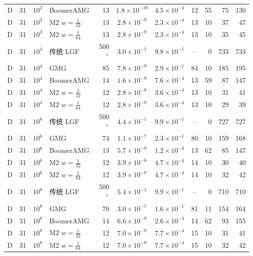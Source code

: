 \begin{longtable}{lrrlrcccrrr}
D & 31 & $10^{2}$ & BoomerAMG & 13 & $1.8{\times}10^{-10}$ & $4.5{\times}10^{-4}$ & 12 & 55 & 75 & 130 \\
D & 31 & $10^{2}$ & M2 $w{=}\frac1{32}$ & 13 & $2.8{\times}10^{-9}$ & $2.3{\times}10^{-4}$ & 13 & 10 & 37 & 47 \\
D & 31 & $10^{2}$ & M2 $w{=}\frac1{64}$ & 13 & $2.8{\times}10^{-9}$ & $2.3{\times}10^{-4}$ & 13 & 10 & 35 & 45 \\
D & 31 & $10^{4}$ & 传统 LGF & 500$^\times$ & $3.0{\times}10^{-1}$ & $9.8{\times}10^{-1}$ & -- & 0 & 733 & 733 \\
D & 31 & $10^{4}$ & GMG & 85 & $7.8{\times}10^{-9}$ & $2.9{\times}10^{-1}$ & 84 & 10 & 185 & 195 \\
D & 31 & $10^{4}$ & BoomerAMG & 14 & $1.6{\times}10^{-9}$ & $7.6{\times}10^{-4}$ & 13 & 59 & 87 & 147 \\
D & 31 & $10^{4}$ & M2 $w{=}\frac1{32}$ & 12 & $2.8{\times}10^{-8}$ & $3.6{\times}10^{-4}$ & 13 & 10 & 31 & 41 \\
D & 31 & $10^{4}$ & M2 $w{=}\frac1{64}$ & 12 & $2.8{\times}10^{-8}$ & $3.6{\times}10^{-4}$ & 13 & 10 & 29 & 39 \\
D & 31 & $10^{6}$ & 传统 LGF & 500$^\times$ & $4.4{\times}10^{-1}$ & $9.9{\times}10^{-1}$ & -- & 0 & 727 & 727 \\
D & 31 & $10^{6}$ & GMG & 74 & $1.1{\times}10^{-7}$ & $2.3{\times}10^{-1}$ & 80 & 10 & 159 & 168 \\
D & 31 & $10^{6}$ & BoomerAMG & 13 & $5.7{\times}10^{-9}$ & $1.2{\times}10^{-3}$ & 13 & 62 & 85 & 147 \\
D & 31 & $10^{6}$ & M2 $w{=}\frac1{32}$ & 12 & $3.9{\times}10^{-8}$ & $4.7{\times}10^{-4}$ & 14 & 10 & 30 & 40 \\
D & 31 & $10^{6}$ & M2 $w{=}\frac1{64}$ & 12 & $3.9{\times}10^{-8}$ & $4.7{\times}10^{-4}$ & 14 & 10 & 32 & 42 \\
D & 31 & $10^{8}$ & 传统 LGF & 500$^\times$ & $5.4{\times}10^{-1}$ & $9.9{\times}10^{-1}$ & -- & 0 & 710 & 710 \\
D & 31 & $10^{8}$ & GMG & 70 & $3.0{\times}10^{-7}$ & $1.6{\times}10^{-1}$ & 81 & 11 & 154 & 164 \\
D & 31 & $10^{8}$ & BoomerAMG & 14 & $6.6{\times}10^{-9}$ & $2.6{\times}10^{-3}$ & 14 & 62 & 93 & 155 \\
D & 31 & $10^{8}$ & M2 $w{=}\frac1{32}$ & 12 & $7.0{\times}10^{-8}$ & $7.7{\times}10^{-4}$ & 15 & 10 & 31 & 41 \\
D & 31 & $10^{8}$ & M2 $w{=}\frac1{64}$ & 12 & $7.0{\times}10^{-8}$ & $7.7{\times}10^{-4}$ & 15 & 10 & 32 & 42 \\

\end{longtable}
